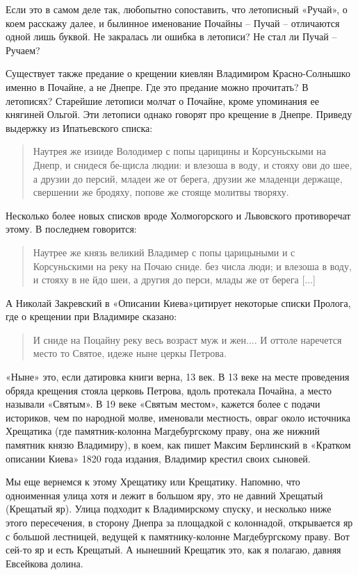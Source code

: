 Если это в самом деле так, любопытно сопоставить, что летописный «Ручай», о коем расскажу далее, и былинное именование Почайны – Пучай – отличаются одной лишь буквой. Не закралась ли ошибка в летописи? Не стал ли Пучай – Ручаем?

Существует также предание о крещении киевлян Владимиром Красно-Солнышко именно в Почайне, а не Днепре. Где это предание можно прочитать? В летописях? Старейшие летописи молчат о Почайне, кроме упоминания ее княгиней Ольгой. Эти летописи однако говорят про крещение в Днепре. Приведу выдержку из Ипатьевского списка:

\begin{quotation}
Наутрея же изииде Володимер с попы царицины и Корсуньскыми на Днепр, и снидеся бе-щисла людии: и влезоша в воду, и стояху ови до шее, а друзии до персий, младеи же от берега, друзии же младенци держаще, свершении же бродяху, попове же стояще молитвы творяху.
\end{quotation}

Несколько более новых списков вроде Холмогорского и Львовского противоречат этому. В последнем говорится:

\begin{quotation}
Наутрее же князь великий Владимер с попы царицыными и с Корсуньскими на реку на Почаю сниде. без числа люди; и влезоша в воду, и стояху в не йдо шеи, а другия до перси, млады же от берега [...]
\end{quotation}

А Николай Закревский в «Описании Киева»\cite{zakr01}цити\-рует некоторые списки Пролога, где о крещении при Владимире сказано:

\begin{quotation}
И сниде на Поцайну реку весь возраст муж и жен.... И оттоле наречется место то Святое, идеже ныне церкы Петрова.
\end{quotation}

«Ныне» это, если датировка книги верна, 13 век. В 13 веке на месте проведения обряда крещения стояла церковь Петрова, вдоль протекала Почайна, а место называли «Святым». В 19 веке «Святым местом», кажется более с подачи историков, чем по народной молве, именовали местность, овраг около источника Хрещатика (где памятник-колонна Магдебургскому праву, она же нижний памятник князю Владимиру), в коем, как пишет Максим Берлинский в «Кратком описании Киева» 1820 года издания\cite{berl01}, Владимир крестил своих сыновей.

Мы еще вернемся к этому Хрещатику или Крещатику. Напомню, что одноименная улица хотя и лежит в большом яру, это не давний Хрещатый (Крещатый яр). Улица подходит к Владимирскому спуску, и несколько ниже этого пересечения, в сторону Днепра за площадкой с колоннадой, открывается яр с большой лестницей, ведущей к памятнику-колонне Магдебургскому праву. Вот сей-то яр и есть Крещатый. А нынешний Крещатик это, как я полагаю, давняя Евсейкова долина.

